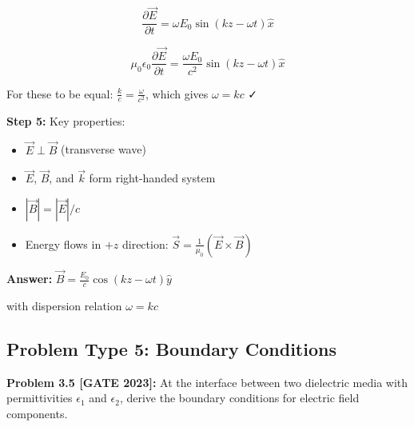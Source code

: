 \documentclass[12pt,a4paper]{article}
\begin{document}
\begin{solution}
$$\frac{\partial \vec{E}}{\partial t} = \omega E_0\sin(kz-\omega t)\hat{x}$$

$$\mu_0\epsilon_0\frac{\partial \vec{E}}{\partial t} = \frac{\omega E_0}{c^2}\sin(kz-\omega t)\hat{x}$$

For these to be equal: $\frac{k}{c} = \frac{\omega}{c^2}$, which gives $\omega = kc$ ✓

\textbf{Step 5:} Key properties:
\begin{itemize}
    \item $\vec{E} \perp \vec{B}$ (transverse wave)
    \item $\vec{E}$, $\vec{B}$, and $\vec{k}$ form right-handed system
    \item $|\vec{B}| = |\vec{E}|/c$
    \item Energy flows in $+z$ direction: $\vec{S} = \frac{1}{\mu_0}(\vec{E} \times \vec{B})$
\end{itemize}

\textbf{Answer:} $\vec{B} = \frac{E_0}{c}\cos(kz-\omega t)\hat{y}$

with dispersion relation $\omega = kc$
\end{solution}

\subsection{Problem Type 5: Boundary Conditions}

\textbf{Problem 3.5 [GATE 2023]:} At the interface between two dielectric media with permittivities $\epsilon_1$ and $\epsilon_2$, derive the boundary conditions for electric field components.
\end{document}

